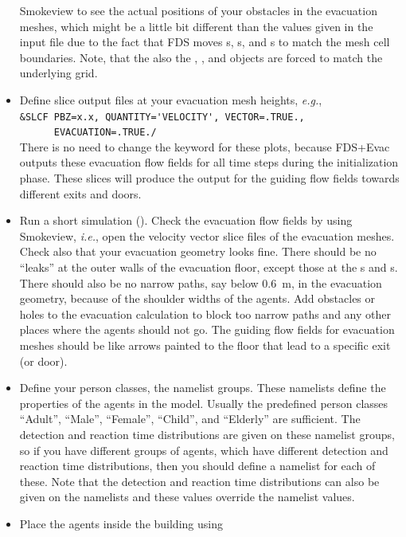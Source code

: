 \documentclass[12pt,a4paper,final,twoside]{stylevk}
\begin{document}
\begin{itemize}
  Smokeview to see the actual positions of your obstacles in the
  evacuation meshes, which might be a little bit different than the
  values given in the input file due to the fact that FDS moves
  s, s, and s to match the mesh
  cell boundaries.  Note, that the also the ,
  , and  objects are forced to match the
  underlying grid.
%
\item Define slice output files at your evacuation mesh heights,
  \emph{e.g.}, \\ 
  \verb|&SLCF PBZ=x.x, QUANTITY='VELOCITY', VECTOR=.TRUE.,|\\
  \verb|      EVACUATION=.TRUE./|\\
  There is no need to change the  keyword for these
  plots, because FDS+Evac outputs these evacuation flow fields for all
  time steps during the initialization phase.  These slices will
  produce the output for the guiding flow fields towards different
  exits and doors.
%
\item Run a short simulation ().  Check the
  evacuation flow fields by using Smokeview, \emph{i.e.}, open the
  velocity vector slice files of the evacuation meshes.  Check also
  that your evacuation geometry looks fine.  There should be no
  ``leaks'' at the outer walls of the evacuation floor, except those
  at the s and s.  There should also be no narrow paths, say
  below 0.6~m, in the evacuation geometry, because of the shoulder
  widths of the agents.  Add obstacles or holes to the evacuation
  calculation to block too narrow paths and any other places where the
  agents should not go.  The guiding flow fields for evacuation meshes
  should be like arrows painted to the floor that lead to a specific
  exit (or door).
%
\item Define your person classes, the  namelist groups.
  These namelists define the properties of the agents in the model.
  Usually the predefined person classes ``Adult'', ``Male'',
  ``Female'', ``Child'', and ``Elderly'' are sufficient.  The
  detection and reaction time distributions are given on these
  namelist groups, so if you have different groups of agents, which
  have different detection and reaction time distributions, then you
  should define a  namelist for each of these.  Note that
  the detection and reaction time distributions can also be given on
  the  namelists and these values override the
   namelist values.
%
\item Place the agents inside the building using 

\end{itemize}
\end{document}
